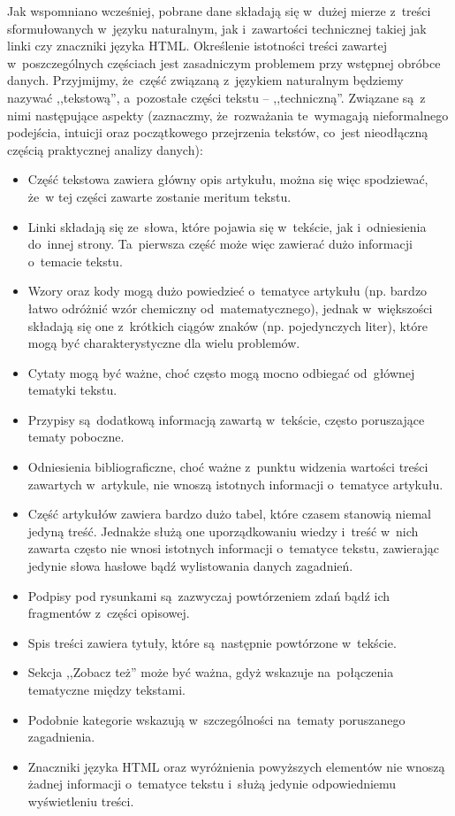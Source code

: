 \documentclass{praca1}
\begin{document}
Jak wspomniano wcześniej, pobrane dane składają się w~dużej mierze z~treści sformułowanych w~języku naturalnym, jak i~zawartości technicznej takiej jak linki czy znaczniki języka HTML. Określenie istotności treści zawartej w~poszczególnych częściach jest zasadniczym problemem przy wstępnej obróbce danych. Przyjmijmy, że~część związaną z~językiem naturalnym będziemy nazywać ,,tekstową'', a~pozostałe części tekstu -- ,,techniczną''. Związane są~z nimi następujące aspekty (zaznaczmy, że~rozważania te~wymagają nieformalnego podejścia, intuicji oraz początkowego przejrzenia tekstów, co~jest nieodłączną częścią praktycznej analizy danych):
\begin{itemize}
\item Część tekstowa zawiera główny opis artykułu, można się więc spodziewać, że~w tej części zawarte zostanie meritum tekstu.
\item Linki składają się ze~słowa, które pojawia się w~tekście, jak i~odniesienia do~innej strony. Ta~pierwsza część może więc zawierać dużo informacji o~temacie tekstu.
\item Wzory oraz kody mogą dużo powiedzieć o~tematyce artykułu (np. bardzo łatwo odróżnić wzór chemiczny od~matematycznego), jednak w~większości składają się one z~krótkich ciągów znaków (np. pojedynczych liter), które mogą być charakterystyczne dla wielu problemów.
\item Cytaty mogą być ważne, choć często mogą mocno odbiegać od~głównej tematyki tekstu.
\item Przypisy są~dodatkową informacją zawartą w~tekście, często poruszające tematy poboczne.
\item Odniesienia bibliograficzne, choć ważne z~punktu widzenia wartości treści zawartych w~artykule, nie wnoszą istotnych informacji o~tematyce artykułu.
\item Część artykułów zawiera bardzo dużo tabel, które czasem stanowią niemal jedyną treść. Jednakże służą one uporządkowaniu wiedzy i~treść w~nich zawarta często nie wnosi istotnych informacji o~tematyce tekstu, zawierając jedynie słowa hasłowe bądź wylistowania danych zagadnień.
\item Podpisy pod rysunkami są~zazwyczaj powtórzeniem zdań bądź ich fragmentów z~części opisowej.
\item Spis treści zawiera tytuły, które są~następnie powtórzone w~tekście.
\item Sekcja ,,Zobacz też'' może być ważna, gdyż wskazuje na~połączenia tematyczne między tekstami.
\item Podobnie kategorie wskazują w~szczególności na~tematy poruszanego zagadnienia.
\item Znaczniki języka HTML oraz wyróżnienia powyższych elementów nie wnoszą żadnej informacji o~tematyce tekstu i~służą jedynie odpowiedniemu wyświetleniu treści.
\end{itemize}
\end{document}
